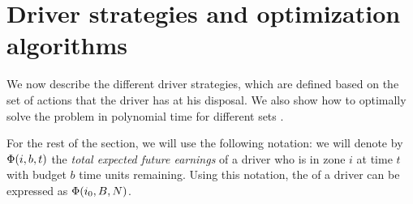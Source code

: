 
\section{Driver strategies and optimization algorithms}
\label{sec:driver_strategies}
We now describe the different driver strategies, which are defined based on the
set of actions {\actionsset} that the driver has at his disposal. We also show how to 
optimally solve
the {\originalproblem} problem in polynomial time for different sets {\actionsset}.

For the rest of the section, we will use the following notation: we will denote by 
$\Phi({i,b,t})$ the \emph{total expected future earnings} of a driver who is in zone $i$ at time $t$ with 
budget $b$ time units remaining. Using this notation,
the {\totalexpectedearnings} of a driver can be expressed as $\Phi({{i_0},B,N})$.


